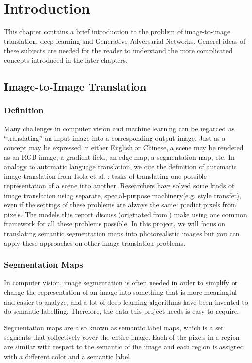 \chapter{Introduction}
\label{cha:intro}
This chapter contains a brief introduction to the problem of image-to-image translation,
deep learning and Generative Adversarial Networks. General ideas of these subjects
are needed for the reader to understand the more complicated concepts introduced in the later
chapters.

\section{Image-to-Image Translation}
\subsection{Definition}
Many challenges in computer vision and machine learning can be regarded as “translating” an 
input image into a corresponding output image. Just as a concept may be expressed in either 
English or Chinese, a scene may be rendered as an RGB image, a gradient field, an edge map, 
a segmentation map, etc. In analogy to automatic language translation, we cite the definition
of automatic image translation from Isola et al. \cite{pix2pix2016}: tasks of translating one 
possible representation of a scene into another. Researchers have solved some kinds of image 
translation using separate, special-purpose machinery(e.g. style transfer\cite{gatys2015neural}),
even if the settings of these problems are always the same: predict pixels from pixels.
The models this report discuss (originated from \cite{pix2pix2016})
make using one common framework for all these problems possible.
In this project, we will focus on translating 
semantic segmentation maps into photorealistic images but you can apply these approaches on
other image translation problems.

\subsection{Segmentation Maps}
In computer vision, image segmentation is often needed in order to simplify or change 
the representation of an image into something that is more meaningful and easier to analyze, 
and a lot of deep learning algorithms have been invented to do semantic labelling. Therefore,
the data this project needs is easy to acquire.

Segmentation maps are also known as semantic label maps, which is a set segments that
collectively cover the entire image. Each of the pixels in a region are similar with 
respect to the semantic of the image and each region is assigned with a different 
color and a semantic label.

